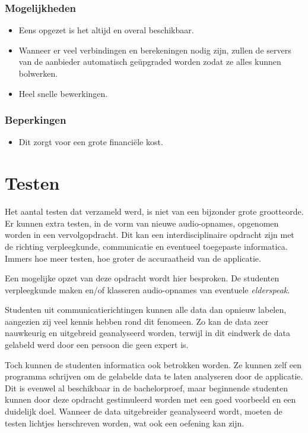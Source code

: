 \subsubsection{Mogelijkheden}
\begin{itemize}
    \item Eens opgezet is het altijd en overal beschikbaar.
    \item Wanneer er veel verbindingen en berekeningen nodig zijn, zullen de servers van de aanbieder automatisch geüpgraded worden zodat ze alles kunnen bolwerken.
    \item Heel snelle bewerkingen.
\end{itemize}
\subsubsection{Beperkingen}
\begin{itemize}
    \item Dit zorgt voor een grote financiële kost.
\end{itemize}
\section{Testen}
Het aantal testen dat verzameld werd, is niet van een bijzonder grote grootteorde. Er kunnen extra testen, in de vorm van nieuwe audio-opnames, opgenomen worden in een vervolgopdracht. Dit kan een interdisciplinaire opdracht zijn met de richting verpleegkunde, communicatie en eventueel toegepaste informatica. Immers hoe meer testen, hoe groter de accuraatheid van de applicatie.

Een mogelijke opzet van deze opdracht wordt hier besproken. De studenten verpleegkunde maken en/of klasseren audio-opnames van eventuele \textit{elderspeak}. 

Studenten uit communicatierichtingen kunnen alle data dan opnieuw labelen, aangezien zij veel kennis hebben rond dit fenomeen. Zo kan de data zeer nauwkeurig en uitgebreid geanalyseerd worden, terwijl in dit eindwerk de data gelabeld werd door een persoon die geen expert is.

Toch kunnen de studenten informatica ook betrokken worden. Ze kunnen zelf een programma schrijven om de gelabelde data te laten analyseren door de applicatie. Dit is evenwel al beschikbaar in de bachelorproef, maar beginnende studenten kunnen door deze opdracht gestimuleerd worden met een goed voorbeeld en een duidelijk doel. Wanneer de data uitgebreider geanalyseerd wordt, moeten de testen lichtjes herschreven worden, wat ook een oefening kan zijn.
